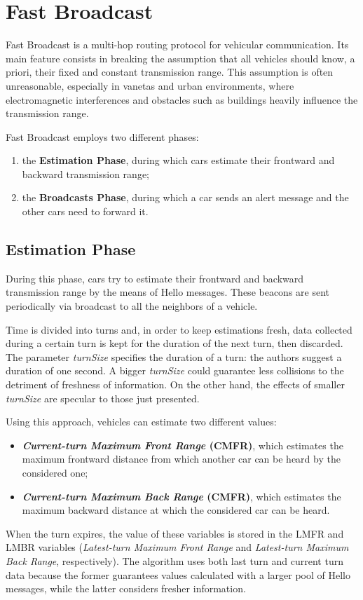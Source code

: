 
\chapter{Fast Broadcast}
	Fast Broadcast \cite{4199282} is a multi-hop routing protocol for vehicular communication. Its main feature consists in breaking the assumption that all vehicles should know, a priori, their fixed and constant transmission range. This assumption is often unreasonable, especially in \acrshort{vaneta}s and urban environments, where electromagnetic interferences and obstacles such as buildings heavily influence the transmission range.
	
	
	Fast Broadcast employs two different phases:
	\begin{enumerate}
		\item the \textbf{Estimation Phase}, during which cars estimate their frontward and backward transmission range;
		\item the \textbf{Broadcasts Phase}, during which a car sends an alert message and the other cars need to forward it.
	\end{enumerate}

	\section{Estimation Phase}
		During this phase, cars try to estimate their frontward and backward transmission range by the means of Hello messages. These beacons are sent periodically via broadcast to all the neighbors of a vehicle.
		
		
		Time is divided into turns and, in order to keep estimations fresh, data collected during a certain turn is kept for the duration of the next turn, then discarded. The parameter \textit{turnSize} specifies the duration of a turn: the authors suggest a duration of one second. A bigger \textit{turnSize} could guarantee less collisions to the detriment of freshness of information. On the other hand, the effects of smaller \textit{turnSize} are specular to those just presented. 
		
		
		Using this approach, vehicles can estimate two different values:
		\begin{itemize}
			\item \textbf{\textit{Current-turn Maximum Front Range} (CMFR)}, which estimates the maximum frontward distance from which another car can be heard by the considered one;
			\item \textbf{\textit{Current-turn Maximum Back Range} (CMFR)}, which estimates the maximum backward distance at which the considered car can be heard.
		\end{itemize}
		When the turn expires, the value of these variables is stored in the LMFR and LMBR variables (\textit{Latest-turn Maximum Front Range} and \textit{Latest-turn Maximum Back Range}, respectively). The algorithm uses both last turn and current turn data because the former guarantees values calculated with a larger pool of Hello messages, while the latter considers fresher information.
		
